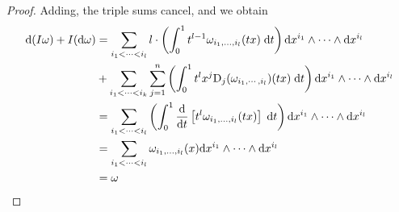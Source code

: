 \begin{proof}
Adding, the triple sums cancel, and we obtain 
\begin{align*}
    \mathrm{d}(I\omega) + I(\mathrm{d}\omega)
    & = \sum_{i_1<\cdots<i_l}l\cdot\left(\int_0^1t^{l-1}\omega_{i_1,\ldots,i_l}(tx)\;\mathrm{d} t\right)\mathrm{d} x^{i_1}\wedge\cdots\wedge\mathrm{d} x^{i_l} \\
    & \hspace*{0em} + \sum_{i_1<\cdots<i_k}^{}\sum_{j=1}^{n}\left(\int_0^1t^l x^j\mathrm{D}_j(\omega_{i_1,\cdots,i_l})(tx)\;\mathrm{d} t\right) \mathrm{d} x^{i_1}\wedge\cdots\wedge\mathrm{d} x^{i_l} \\
    & = \sum_{i_1<\cdots<i_l}\left(\int_0^1\frac{\mathrm{d} }{\mathrm{d} t}\left[t^{l}\omega_{i_1,\ldots,i_l}(tx)\right]\;\mathrm{d} t\right)\mathrm{d} x^{i_1}\wedge\cdots\wedge\mathrm{d} x^{i_l} \\
    & = \sum_{i_1<\cdots<i_l}\omega_{i_1,\ldots,i_l}(x)\mathrm{d} x^{i_1}\wedge\cdots\wedge\mathrm{d} x^{i_l} \\
    & = \omega
\end{align*}
\end{proof}

